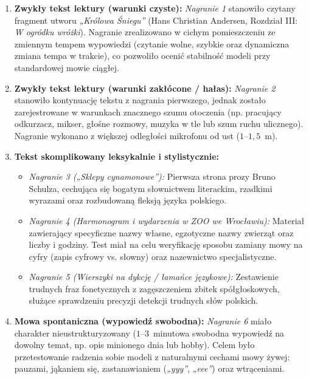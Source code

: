 \begin{enumerate}
    \item \textbf{Zwykły tekst lektury (warunki czyste):} 
    \textit{Nagranie 1} stanowiło czytany fragment utworu \textit{„Królowa Śniegu”} (Hans Christian Andersen, Rozdział III: \textit{W ogródku wróżki}). Nagranie zrealizowano w cichym pomieszczeniu ze zmiennym tempem wypowiedzi (czytanie wolne, szybkie oraz dynamiczna zmiana tempa w trakcie), co pozwoliło ocenić stabilność modeli przy standardowej mowie ciągłej.

    \item \textbf{Zwykły tekst lektury (warunki zakłócone / hałas):} 
    \textit{Nagranie 2} stanowiło kontynuację tekstu z nagrania pierwszego, jednak zostało zarejestrowane w warunkach znacznego szumu otoczenia (np. pracujący odkurzacz, mikser, głośne rozmowy, muzyka w tle lub szum ruchu ulicznego). Nagranie wykonano z większej odległości mikrofonu od ust ($1$--$1{,}5$~m).

    \item \textbf{Tekst skomplikowany leksykalnie i stylistycznie:}
    \begin{itemize}
        \item \textit{Nagranie 3 (\textit{„Sklepy cynamonowe”}):} Pierwsza strona prozy Bruno Schulza, cechująca się bogatym słownictwem literackim, rzadkimi wyrazami oraz rozbudowaną fleksją języka polskiego.
        \item \textit{Nagranie 4 (Harmonogram i wydarzenia w ZOO we Wrocławiu):} Materiał zawierający specyficzne nazwy własne, egzotyczne nazwy zwierząt oraz liczby i godziny. Test miał na celu weryfikację sposobu zamiany mowy na cyfry (zapis cyfrowy vs. słowny) oraz nazewnictwo specjalistyczne.
        \item \textit{Nagranie 5 (Wierszyki na dykcję / łamańce językowe):} Zestawienie trudnych fraz fonetycznych z zagęszczeniem zbitek spółgłoskowych, służące sprawdzeniu precyzji detekcji trudnych słów polskich.
    \end{itemize}

    \item \textbf{Mowa spontaniczna (wypowiedź swobodna):} 
    \textit{Nagranie 6} miało charakter nieustrukturyzowany ($1$--$3$~minutowa swobodna wypowiedź na dowolny temat, np. opis minionego dnia lub hobby). Celem było przetestowanie radzenia sobie modeli z naturalnymi cechami mowy żywej: pauzami, jąkaniem się, zastanawianiem (\textit{„yyy”}, \textit{„eee”}) oraz wtrąceniami.
\end{enumerate}

